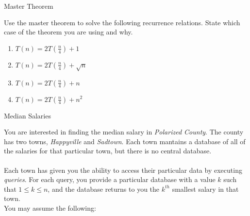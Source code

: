 \documentclass[10pt]{article}
\begin{document}
\thispagestyle{empty}
\handout





\begin{problem} Master Theorem \end{problem}

Use the master theorem to solve the following recurrence relations. State which case of the theorem you are using and why.

\begin{enumerate}

  \item $T(n)=2T(\frac{n}{4})+1$

\solution{
}


  \item $T(n)=2T(\frac{n}{4})+\sqrt{n}$

\solution{
}


  \item $T(n)=2T(\frac{n}{4})+n$

\solution{
}


  \item $T(n)=2T(\frac{n}{4})+n^2$

\solution{
}


\end{enumerate}




\begin{problem} Median Salaries \end{problem}

You are interested in finding the median salary in \emph{Polarized County}. The county has two towns, \emph{Happyville} and \emph{Sadtown}. Each town mantains a database of all of the salaries for that particular town, but there is no central database.\\
\\
Each town has given you the ability to access their particular data by executing \emph{queries}. For each query, you provide a particular database with a value $k$ such that $1 \leq k \leq n$, and the database returns to you the $k^{th}$ smallest salary in that town.
\\
You may assume the following:
\end{document}
